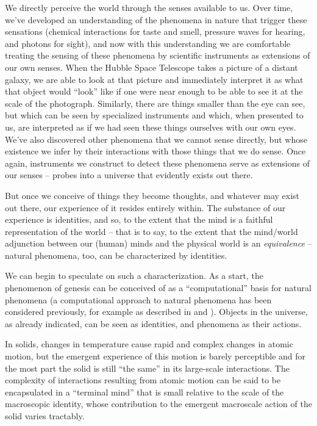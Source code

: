 \documentclass[pra,twocolumn,groupedaddress,10pt]{revtex4}
\theoremstyle{definition}
\begin{document}
We directly perceive the world through the senses available to us. Over time, we've developed an understanding of the phenomena in nature that trigger these sensations (chemical interactions for taste and smell, pressure waves for hearing, and photons for sight), and now with this understanding we are comfortable treating the sensing of these phenomena by scientific instruments as extensions of our own senses. When the Hubble Space Telescope takes a picture of a distant galaxy, we are able to look at that picture and immediately interpret it as what that object would ``look'' like if one were near enough to be able to see it at the scale of the photograph. Similarly, there are things smaller than the eye can see, but which can be seen by specialized instruments and which, when presented to us, are interpreted as if we had seen these things ourselves with our own eyes. We've also discovered other phenomena that we cannot sense directly, but whose existence we infer by their interactions with those things that we do sense. Once again, instruments we construct to detect these phenomena serve as extensions of our senses -- probes into a universe that evidently exists out there.

But once we conceive of things they become thoughts, and whatever may exist out there, our experience of it resides entirely within. The substance of our experience is identities, and so, to the extent that the mind is a faithful representation of the world -- that is to say, to the extent that the mind/world adjunction between our (human) minds and the physical world is an \textit{equivalence} -- natural phenomena, too, can be characterized by identities.

We can begin to speculate on such a characterization. As a start, the phenomenon of genesis can be conceived of as a ``computational'' basis for natural phenomena (a computational approach to natural phenomena has been considered previously, for example as described in \cite{greatideas} and \cite{wolfram}). Objects in the universe, as already indicated, can be seen as identities, and phenomena as their actions.

In solids, changes in temperature cause rapid and complex changes in atomic motion, but the emergent experience of this motion is barely perceptible and for the most part the solid is still ``the same'' in its large-scale interactions. The complexity of interactions resulting from atomic motion can be said to be encapsulated in a ``terminal mind'' that is small relative to the scale of the macroscopic identity, whose contribution to the emergent macroscale action of the solid varies tractably.
\end{document}
